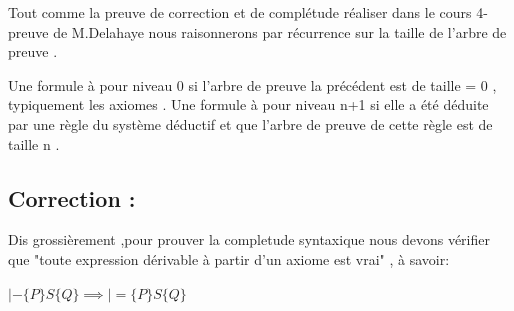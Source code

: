 \documentclass{article}
\begin{document}
Tout comme la preuve de correction et de complétude réaliser dans le cours 4-preuve de M.Delahaye nous raisonnerons par récurrence sur la taille de l'arbre de preuve .

Une formule à pour niveau 0 si l'arbre de preuve la précédent est de taille = 0 , typiquement les axiomes .
Une formule à pour niveau n+1 si elle a été déduite par une règle du système déductif et que l'arbre de preuve de cette règle est de taille n .


\subsection{ Correction : }

Dis grossièrement ,pour prouver la completude syntaxique  nous devons vérifier que  "toute expression dérivable à partir d'un axiome est vrai" , à savoir:

$|- \{P\}S\{Q\} \implies |= \{P\}S\{Q\}  $  
\end{document}
